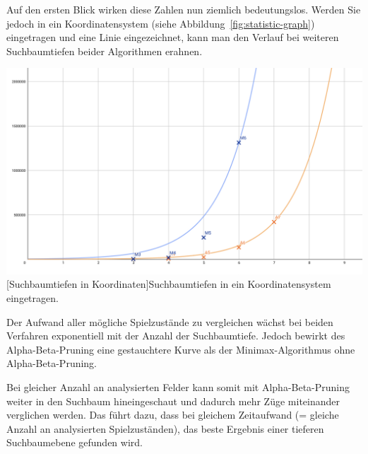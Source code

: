 Auf den ersten Blick wirken diese Zahlen nun ziemlich bedeutungslos.
Werden Sie jedoch in ein Koordinatensystem (siehe Abbildung~\ref{fig:statistic-graph}) eingetragen und eine Linie eingezeichnet, kann man den Verlauf bei weiteren Suchbaumtiefen beider Algorithmen erahnen.

\vspace{1em}
\begin{minipage}{\linewidth}
    \centering
    \includegraphics[width=0.7\linewidth]{pics/statistic-graph}
    [Suchbaumtiefen in Koordinaten]{Suchbaumtiefen in ein Koordinatensystem eingetragen.}
    \label{fig:statistic-graph}
\end{minipage}

Der Aufwand aller m\"ogliche Spielzust\"ande zu vergleichen w\"achst bei beiden Verfahren exponentiell mit der Anzahl der Suchbaumtiefe.
Jedoch bewirkt des Alpha-Beta-Pruning eine gestauchtere Kurve als der Minimax-Algorithmus ohne Alpha-Beta-Pruning.

Bei gleicher Anzahl an analysierten Felder kann somit mit Alpha-Beta-Pruning weiter in den Suchbaum hineingeschaut und dadurch mehr Z\"uge miteinander verglichen werden.
Das f\"uhrt dazu, dass bei gleichem Zeitaufwand (= gleiche Anzahl an analysierten Spielzust\"anden), das beste Ergebnis einer tieferen Suchbaumebene gefunden wird.

\bigskip
\newpage